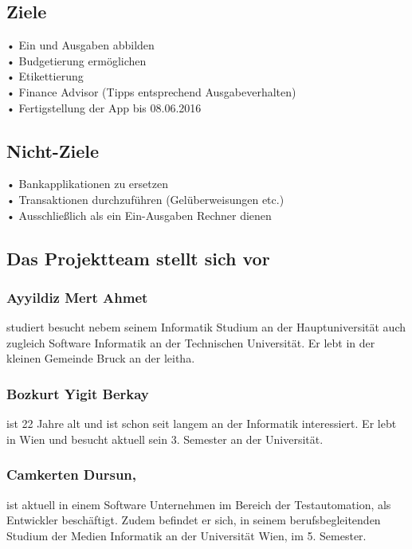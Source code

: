 \documentclass[runningheads,a4paper]{llncs}
\begin{document}
\subsection{Ziele}
•	Ein und Ausgaben abbilden\\
•	Budgetierung ermöglichen\\
•	Etikettierung \\
•	Finance Advisor (Tipps entsprechend Ausgabeverhalten)\\
•	Fertigstellung der App bis 08.06.2016\\


\subsection{Nicht-Ziele}
•	Bankapplikationen zu ersetzen\\
•	Transaktionen durchzuführen (Gelüberweisungen etc.)\\
•	Ausschließlich als ein Ein-Ausgaben Rechner dienen\\



\subsection{Das Projektteam stellt sich vor}
\subsubsection{Ayyildiz Mert Ahmet}
studiert besucht nebem seinem Informatik Studium an der Hauptuniversität auch zugleich Software Informatik an der Technischen Universität.
Er lebt in der kleinen Gemeinde Bruck an der leitha.

\subsubsection{Bozkurt Yigit Berkay}
ist 22 Jahre alt und ist schon seit langem an der Informatik interessiert. Er lebt in Wien und besucht aktuell sein 3. Semester an der Universität.

\subsubsection{Camkerten Dursun,}
ist aktuell in einem Software Unternehmen im Bereich der Testautomation, als Entwickler beschäftigt. Zudem befindet er sich, in seinem berufsbegleitenden Studium der Medien Informatik an der Universität Wien, im 5. Semester. 
\end{document}
